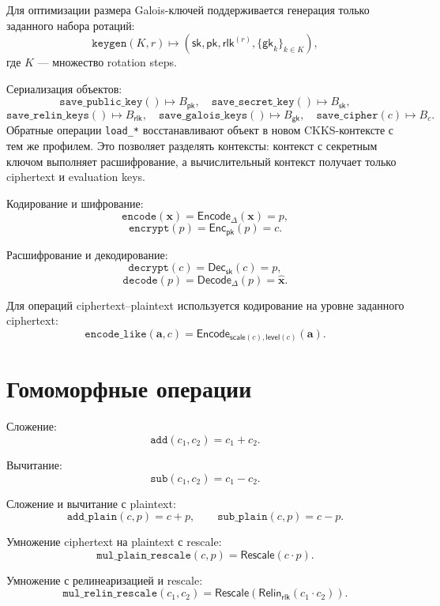 \documentclass[12pt]{article}
\begin{document}
Для оптимизации размера Galois-ключей поддерживается генерация только
заданного набора ротаций:
\[
    \texttt{keygen}(K,r) \mapsto
    (\mathsf{sk}, \mathsf{pk}, \mathsf{rlk}^{(r)}, \{\mathsf{gk}_k\}_{k \in K}),
\]
где \(K\) --- множество rotation steps.

Сериализация объектов:
\[
    \texttt{save\_public\_key}() \mapsto B_{\mathsf{pk}},
    \quad
    \texttt{save\_secret\_key}() \mapsto B_{\mathsf{sk}},
\]
\[
    \texttt{save\_relin\_keys}() \mapsto B_{\mathsf{rlk}},
    \quad
    \texttt{save\_galois\_keys}() \mapsto B_{\mathsf{gk}},
    \quad
    \texttt{save\_cipher}(c) \mapsto B_c.
\]
Обратные операции \texttt{load\_*} восстанавливают объект в новом
CKKS-контексте с тем же профилем. Это позволяет разделять контексты:
контекст с секретным ключом выполняет расшифрование, а вычислительный
контекст получает только ciphertext и evaluation keys.

Кодирование и шифрование:
\[
    \texttt{encode}(\mathbf{x}) =
    \mathsf{Encode}_{\Delta}(\mathbf{x}) = p,
\]
\[
    \texttt{encrypt}(p) =
    \mathsf{Enc}_{\mathsf{pk}}(p) = c.
\]

Расшифрование и декодирование:
\[
    \texttt{decrypt}(c) =
    \mathsf{Dec}_{\mathsf{sk}}(c) = p,
\]
\[
    \texttt{decode}(p) =
    \mathsf{Decode}_{\Delta}(p) = \hat{\mathbf{x}}.
\]

Для операций ciphertext--plaintext используется кодирование на уровне
заданного ciphertext:
\[
    \texttt{encode\_like}(\mathbf{a},c)
    =
    \mathsf{Encode}_{\mathsf{scale}(c),\mathsf{level}(c)}(\mathbf{a}).
\]

\section*{Гомоморфные операции}

Сложение:
\[
    \texttt{add}(c_1,c_2) = c_1 + c_2.
\]

Вычитание:
\[
    \texttt{sub}(c_1,c_2) = c_1 - c_2.
\]

Сложение и вычитание с plaintext:
\[
    \texttt{add\_plain}(c,p) = c + p,
    \qquad
    \texttt{sub\_plain}(c,p) = c - p.
\]

Умножение ciphertext на plaintext с rescale:
\[
    \texttt{mul\_plain\_rescale}(c,p)
    =
    \mathsf{Rescale}(c \cdot p).
\]

Умножение с релинеаризацией и rescale:
\[
    \texttt{mul\_relin\_rescale}(c_1,c_2)
    =
    \mathsf{Rescale}
    \left(
        \mathsf{Relin}_{\mathsf{rlk}}(c_1 \cdot c_2)
    \right).
\]
\end{document}
